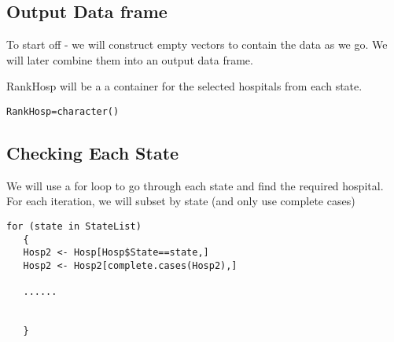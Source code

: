 \documentclass[]{article}
\begin{document}
\subsection{Output Data frame}

To start off - we will construct empty vectors to contain the data as we go.
We will later combine them into an output data frame.

RankHosp will be a a container for the selected hospitals from each state.

\begin{framed}
\begin{verbatim}
RankHosp=character()
\end{verbatim}
\end{framed}
\subsection{Checking Each State}

We will use a for loop to go through each state and find the required hospital.
For each iteration, we will subset by state (and only use complete cases)
\begin{verbatim}
for (state in StateList)
   {
   Hosp2 <- Hosp[Hosp$State==state,]
   Hosp2 <- Hosp2[complete.cases(Hosp2),]
   
   ......
  
    
   }
\end{verbatim}
\end{document}
